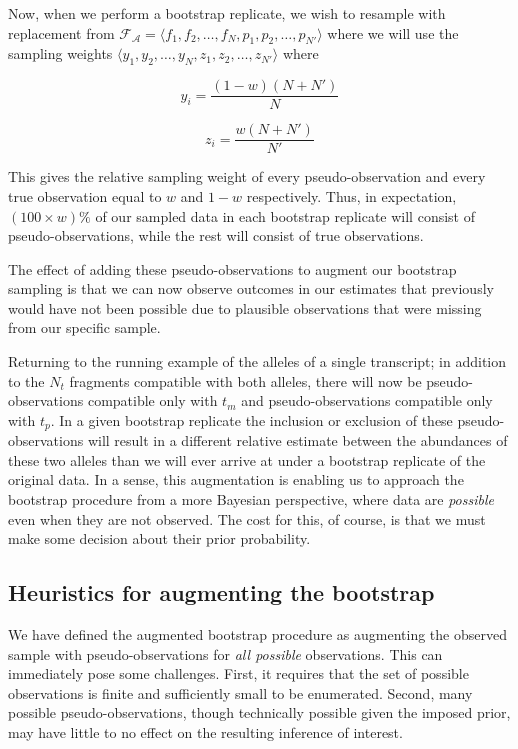 Now, when we perform a bootstrap replicate, we wish to resample with replacement from 
$\mathcal{F_{A}} = \langle f_1, f_2, \dots, f_N, p_1, p_2, \dots, p_{N'} \rangle$ where we will use 
the sampling weights $\langle y_1, y_2, \dots, y_N, z_1, z_2, \dots, z_{N'}\rangle$ where 

$$
y_i = \frac{(1-w) (N+N')}{N}
$$


$$
z_i = \frac{w (N+N')}{N'}
$$

This gives the relative sampling weight of every pseudo-observation and every true observation
equal to $w$ and $1-w$ respectively. Thus, in expectation, $(100 \times w)\%$ of our sampled data 
in each bootstrap replicate will consist of pseudo-observations, while the rest will consist of 
true observations.

The effect of adding these pseudo-observations to augment our bootstrap sampling is that we can now 
observe outcomes in our estimates that previously would have not been possible due to plausible 
observations that were missing from our specific sample.

Returning to the running example of the alleles of a single transcript; in addition to the $N_t$ 
fragments compatible with both alleles, there will now be pseudo-observations compatible only with 
$t_m$ and pseudo-observations compatible only with $t_p$.  In a given bootstrap replicate the 
inclusion or exclusion of these pseudo-observations will result in a different relative estimate 
between the abundances of these two alleles than we will ever arrive at under a bootstrap replicate 
of the original data.  In a sense, this augmentation is enabling us to approach the bootstrap 
procedure from a more Bayesian perspective, where data are \textit{possible} even when they are not 
observed.  The cost for this, of course, is that we must make some decision about their prior probability.

\subsection{Heuristics for augmenting the bootstrap}

We have defined the augmented bootstrap procedure as augmenting the observed sample with 
pseudo-observations for \textit{all possible} observations. This can immediately pose some challenges. 
First, it requires that the set of possible observations is finite and sufficiently small to be 
enumerated. Second, many possible pseudo-observations, though technically possible given the 
imposed prior, may have little to no effect on the resulting inference of interest.


